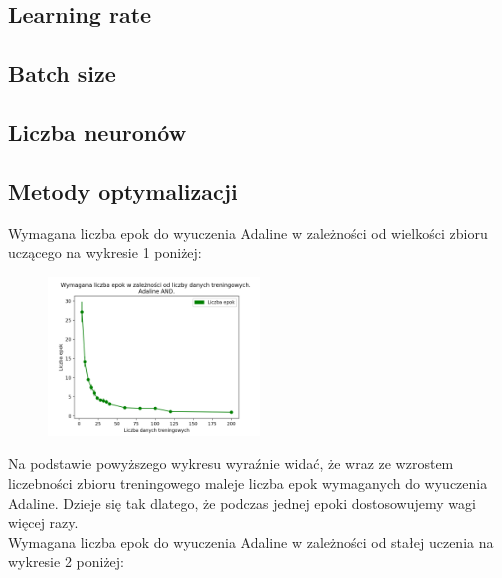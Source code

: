 \documentclass{article}
\begin{document}
	\subsection{Learning rate}
	\subsection{Batch size}
	\subsection{Liczba neuronów}
	\subsection{Metody optymalizacji}
	
	    Wymagana liczba epok do wyuczenia Adaline w zależności od wielkości zbioru uczącego na wykresie 1 poniżej:
	    
	\begin{figure}[h]

		\centering
		\caption{}
		\includegraphics[width=0.5\textwidth]{epoki_dane_adaline_and.png}
		
	\end{figure}	 
	Na podstawie powyższego wykresu wyraźnie widać, że wraz ze wzrostem liczebności zbioru treningowego maleje liczba epok wymaganych do wyuczenia Adaline. Dzieje się tak dlatego, że podczas jednej epoki dostosowujemy wagi więcej razy.\\[0.5cm] 
	
	Wymagana liczba epok do wyuczenia Adaline w zależności od stałej uczenia na wykresie 2 poniżej:
	
\end{document}
